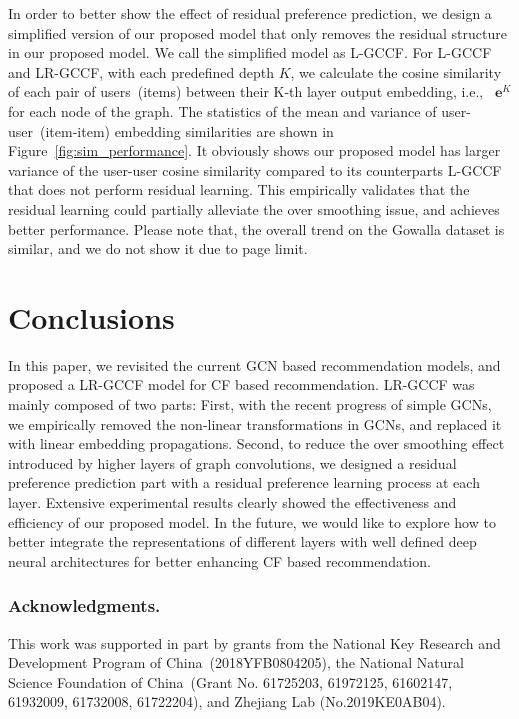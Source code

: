 \documentclass[letterpaper]{article} %
\begin{document}
In order to better show the effect of residual preference prediction, we design a simplified version of our proposed model that only removes the residual structure in our proposed model. We call the simplified model as L-GCCF. For L-GCCF and LR-GCCF, with each predefined depth $K$, we calculate the cosine similarity of each pair of users~(items) between their K-th layer output embedding, i.e., ~$\mathbf{e}^K$ for each node of the graph. The statistics of the mean and variance of user-user~(item-item) embedding similarities are shown in Figure~\ref{fig:sim_performance}. It obviously shows our proposed model has larger variance of the user-user cosine similarity compared to its counterparts L-GCCF that does not perform residual learning. This empirically validates that the residual learning could partially alleviate the over smoothing issue, and achieves better performance. Please note that, the overall trend on the Gowalla dataset is similar, and we do not show it due to page limit.
 
  

\section{Conclusions}
 In this paper, we revisited the current GCN based recommendation models, and proposed a LR-GCCF model for CF based recommendation. LR-GCCF was mainly composed of two parts: First,  with the recent progress of simple GCNs, we empirically removed the non-linear transformations in GCNs, and replaced it with linear embedding propagations. Second, to reduce the over smoothing effect introduced by higher layers of graph convolutions, we designed a residual preference prediction part with a residual preference learning process at each layer.  Extensive experimental results clearly showed the effectiveness and  efficiency of our proposed model. 
 In the future, we would like to explore how to better integrate the representations of different layers with well defined deep neural architectures  for better enhancing CF based recommendation.
 

\subsubsection{Acknowledgments.}
This work was supported in part by grants from  the National Key Research and Development Program of China~(2018YFB0804205), the National Natural Science Foundation of China~(Grant No. 61725203, 61972125, 61602147, 61932009, 61732008, 61722204), and Zhejiang Lab (No.2019KE0AB04).

 

 
\end{document}
